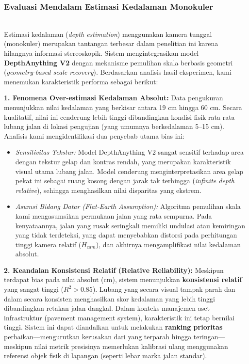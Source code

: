\documentclass{iopjournal}
\begin{document}
\subsubsection{Evaluasi Mendalam Estimasi Kedalaman Monokuler}
\mbox{}\\
Estimasi kedalaman (\textit{depth estimation}) menggunakan kamera tunggal (monokuler) merupakan tantangan terbesar dalam penelitian ini karena hilangnya informasi stereoskopik. Sistem mengintegrasikan model \textbf{DepthAnything V2} dengan mekanisme pemulihan skala berbasis geometri (\textit{geometry-based scale recovery}). Berdasarkan analisis hasil eksperimen, kami menemukan karakteristik performa sebagai berikut:

\textbf{1. Fenomena Over-estimasi Kedalaman Absolut:}
Data pengukuran menunjukkan nilai kedalaman yang berkisar antara 19 cm hingga 60 cm. Secara kualitatif, nilai ini cenderung lebih tinggi dibandingkan kondisi fisik rata-rata lubang jalan di lokasi pengujian (yang umumnya berkedalaman 5--15 cm). Analisis kami mengidentifikasi dua penyebab utama bias ini:
\begin{itemize}
    \item \textit{Sensitivitas Tekstur:} Model DepthAnything V2 sangat sensitif terhadap area dengan tekstur gelap dan kontras rendah, yang merupakan karakteristik visual utama lubang jalan. Model cenderung menginterpretasikan area gelap pekat ini sebagai ruang kosong dengan jarak tak terhingga (\textit{infinite depth relative}), sehingga menghasilkan nilai disparitas yang ekstrem.
    \item \textit{Asumsi Bidang Datar (Flat-Earth Assumption):} Algoritma pemulihan skala kami mengasumsikan permukaan jalan yang rata sempurna. Pada kenyataannya, jalan yang rusak seringkali memiliki undulasi atau kemiringan yang tidak terdeteksi, yang dapat menyebabkan distorsi pada perhitungan tinggi kamera relatif ($H_{cam}$), dan akhirnya mengamplifikasi nilai kedalaman absolut.
\end{itemize}

\textbf{2. Keandalan Konsistensi Relatif (Relative Reliability):}
Meskipun terdapat bias pada nilai absolut (cm), sistem menunjukkan \textbf{konsistensi relatif} yang sangat tinggi ($R^2 > 0.85$). Lubang yang secara visual tampak parah dan dalam secara konsisten menghasilkan skor kedalaman yang lebih tinggi dibandingkan retakan jalan dangkal. Dalam konteks manajemen aset infrastruktur (pavement management system), karakteristik ini tetap bernilai tinggi. Sistem ini dapat diandalkan untuk melakukan \textbf{ranking prioritas} perbaikan---mengurutkan kerusakan dari yang terparah hingga teringan---meskipun nilai metrik presisinya memerlukan kalibrasi ulang menggunakan referensi objek fisik di lapangan (seperti lebar marka jalan standar).
\end{document}
